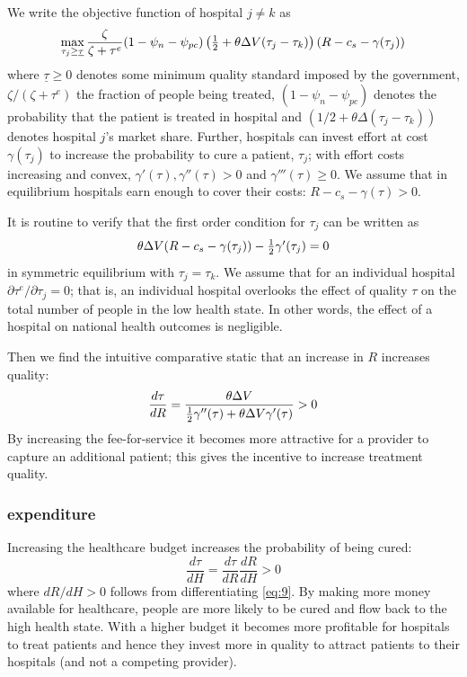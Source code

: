\documentclass[a4paper,12pt]{article}
\begin{document}
We write the objective function of hospital \(j \neq k\) as
\begin{equation}
\label{eq:12}
\max_{\tau_j \geq \underline \tau} \frac{\zeta}{\zeta + \tau^e}(1-\psi_n-\psi_{pc})\left( \textstyle{1\over 2}  + \theta \Delta V (\tau_j - \tau_k) \right)(R-c_s - \gamma (\tau_j))
\end{equation}
where \(\underline \tau \geq 0\) denotes some minimum quality standard imposed by the government, \(\zeta/(\zeta+\tau^e)\) the fraction of people being treated, \((1-\psi_n - \psi_{pc})\) denotes the probability that the patient is treated in hospital and \((1/2 + \theta \Delta (\tau_j - \tau_k))\) denotes hospital \(j\)'s market share. Further, hospitals can invest effort at cost \(\gamma( \tau_j)\) to increase the probability to cure a patient, \(\tau_j\); with effort costs increasing and convex, \(\gamma'(\tau),\gamma''(\tau)>0\) and \(\gamma'''(\tau) \geq 0\). We assume that in equilibrium hospitals earn enough to cover their costs: \(R - c_s - \gamma(\tau) >0\).

It is routine to verify that the first order condition for \(\tau_j\) can be written as
\begin{equation}
\label{eq:13}
\theta \Delta V (R-c_s-\gamma(\tau_j))- \textstyle{1\over 2} \gamma'(\tau_{j})=0
\end{equation}
in symmetric equilibrium with \(\tau_j = \tau_k\). We assume that for an individual hospital \(\partial \tau^e/ \partial \tau_j =0\); that is, an individual hospital overlooks the effect of quality \(\tau\) on the total number of people in the low health state. In other words, the effect of a hospital on national health outcomes is negligible.

Then we find the intuitive comparative static that an increase in \(R\) increases quality:
\begin{equation}
\label{eq:20}
\frac{d\tau}{dR} = \frac{\theta \Delta V}{ \textstyle{1\over 2} \gamma''(\tau)+\theta \Delta V \gamma'(\tau) } > 0
\end{equation}
By increasing the fee-for-service  it becomes more attractive for a provider to capture an additional patient; this gives the incentive to increase treatment quality.


\subsubsection{expenditure}
\label{sec:org104b2c5}

Increasing the healthcare budget increases the probability of being cured:
\begin{equation}
\label{eq:16}
\frac{d\tau}{dH} = \frac{d\tau}{dR} \frac{dR}{dH} > 0
\end{equation}
where \(dR/dH > 0\) follows from differentiating \eqref{eq:9}. By making more money available for healthcare, people are more likely to be cured and flow back to the high health state. With a higher budget it becomes more profitable for hospitals to treat patients and hence they invest more in quality to attract patients to their hospitals (and not a competing provider).
\end{document}
